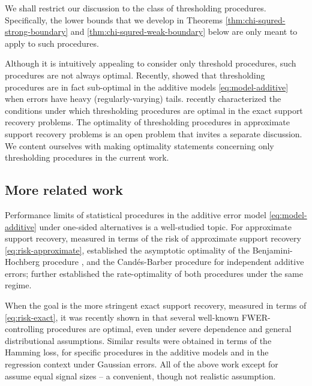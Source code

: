 We shall restrict our discussion to the class of thresholding procedures.
Specifically, the lower bounds that we develop in Theorems \ref{thm:chi-squred-strong-boundary} and \ref{thm:chi-squred-weak-boundary} below are only meant to apply to such procedures.

\begin{remark}
Although it is intuitively appealing to consider only threshold procedures, such procedures are not always optimal.
Recently, \citet{chen2018scan} showed that thresholding procedures are in fact sub-optimal in the additive models \eqref{eq:model-additive} when errors have heavy (regularly-varying) tails. 
\citet{gao2018fundamental} recently characterized the conditions under which thresholding procedures are optimal in the exact support recovery problems.
The optimality of thresholding procedures in approximate support recovery problems is an open problem that invites a separate discussion. 
We content ourselves with making optimality statements concerning only thresholding procedures in the current work.
\end{remark}


\subsection{More related work}

Performance limits of statistical procedures in the additive error model \eqref{eq:model-additive} under one-sided alternatives is a well-studied topic.
For approximate support recovery, measured in terms of the risk of approximate support recovery \eqref{eq:risk-approximate}, \citet*{arias2017distribution} established the asymptotic optimality of the Benjamini-Hochberg procedure \cite{benjamini1995controlling}, and the Cand\'es-Barber procedure \cite{barber2015controlling} for independent additive errors;
\citet{rabinovich2017optimal} further established the rate-optimality of both procedures under the same regime.

When the goal is the more stringent exact support recovery, measured in terms of \eqref{eq:risk-exact}, it was recently shown in \cite{gao2018fundamental} that several well-known FWER-controlling procedures are optimal, even under severe dependence and general distributional assumptions.
Similar results were obtained in terms of the Hamming loss, for specific procedures in the additive models \cite{butucea2018variable} and in the regression context \cite{ji2012ups,jin2014optimality} under Gaussian errors.
All of the above work except for \cite{gao2018fundamental} assume equal signal sizes -- a convenient, though not realistic assumption.

